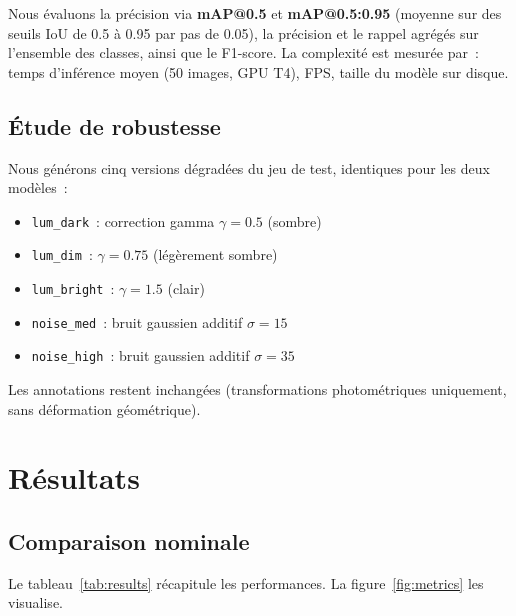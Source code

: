 \documentclass[conference]{IEEEtran}
\begin{document}
Nous évaluons la précision via \textbf{mAP@0.5} et \textbf{mAP@0.5{:}0.95} (moyenne sur des seuils IoU de 0.5 à 0.95 par pas de 0.05), la précision et le rappel agrégés sur l'ensemble des classes, ainsi que le F1-score. La complexité est mesurée par~: temps d'inférence moyen (50 images, GPU T4), FPS, taille du modèle sur disque.

\subsection{Étude de robustesse}

Nous générons cinq versions dégradées du jeu de test, identiques pour les deux modèles~:
\begin{itemize}
\item \texttt{lum\_dark}~: correction gamma $\gamma = 0.5$ (sombre)
\item \texttt{lum\_dim}~: $\gamma = 0.75$ (légèrement sombre)
\item \texttt{lum\_bright}~: $\gamma = 1.5$ (clair)
\item \texttt{noise\_med}~: bruit gaussien additif $\sigma = 15$
\item \texttt{noise\_high}~: bruit gaussien additif $\sigma = 35$
\end{itemize}
Les annotations restent inchangées (transformations photométriques uniquement, sans déformation géométrique).

\section{Résultats}

\subsection{Comparaison nominale}

Le tableau~\ref{tab:results} récapitule les performances. La figure~\ref{fig:metrics} les visualise.
\end{document}

